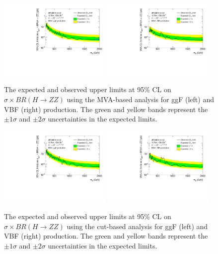 \begin{figure}[h]
    \centering
    \includegraphics[width=0.48\textwidth]{figures/HMHZZ/results/limits_DNN_ggF.pdf}
    \includegraphics[width=0.48\textwidth]{figures/HMHZZ/results/limits_DNN_VBF.pdf}
    \caption{The expected and observed upper limits at 95\% CL on $\sigma \times BR(H \rightarrow ZZ)$ using the MVA-based analysis for ggF (left) and VBF (right) production. The green and yellow bands represent the $\pm 1\sigma$ and $\pm 2\sigma$ uncertainties in the expected limits.
 }
    \label{fig:NWA201518_MVA}
\end{figure}

\begin{figure}[h]
    \centering
    \includegraphics[width=0.48\textwidth]{figures/HMHZZ/results/limits_Cut2020_ggF.pdf}
    \includegraphics[width=0.48\textwidth]{figures/HMHZZ/results/limits_Cut2020_VBF.pdf}
    \caption{The expected and observed upper limits at 95\% CL on $\sigma \times BR(H \rightarrow ZZ)$ using the cut-based analysis for ggF (left) and VBF (right) production. The green and yellow bands represent the $\pm 1\sigma$ and $\pm 2\sigma$ uncertainties in the expected limits.
 }
    \label{fig:NWA201518_Cut}
\end{figure}

